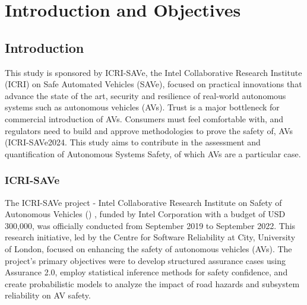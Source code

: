 

\chapter{Introduction and Objectives}
\label{Intro} 


\section{Introduction}


This study is sponsored by ICRI-SAVe, the Intel Collaborative Research Institute (ICRI) on Safe Automated Vehicles (SAVe), focused on practical innovations that advance the state of the art, security and resilience of real-world autonomous systems such as autonomous vehicles (AVs). Trust is a major bottleneck for commercial introduction of AVs. Consumers must feel comfortable with, and regulators need to build and approve methodologies to prove the safety of, AVs ({ICRI-SAVe2024}. This study aims to contribute in the assessment and quantification of Autonomous Systems Safety, of which AVs are a particular case.


\subsection{ICRI-SAVe}


The ICRI-SAVe project - Intel Collaborative Research Institute on Safety of Autonomous Vehicles (\cite{ICRI-SAVe2024}) , funded by Intel Corporation with a budget of USD 300,000, was officially conducted from September 2019 to September 2022. This research initiative, led by the Centre for Software Reliability at City, University of London, focused on enhancing the safety of autonomous vehicles (AVs). The project's primary objectives were to develop structured assurance cases using Assurance 2.0, employ statistical inference methods for safety confidence, and create probabilistic models to analyze the impact of road hazards and subsystem reliability on AV safety.

